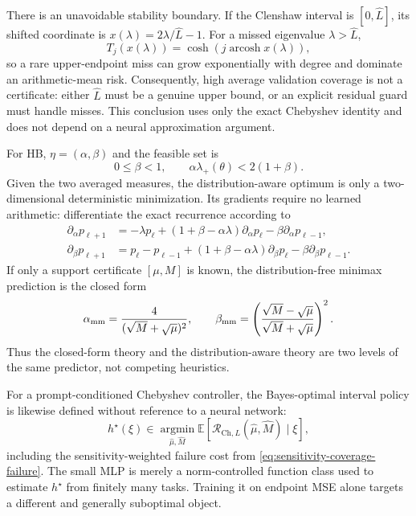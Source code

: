 \documentclass[11pt]{article}
\newcommand{\E}{\mathbb E}
\begin{document}
There is an unavoidable stability boundary.  If the Clenshaw interval is
$[0,\widehat L]$, its shifted coordinate is
$x(\lambda)=2\lambda/\widehat L-1$.  For a missed eigenvalue
$\lambda>\widehat L$,
\[
 T_j(x(\lambda))
 =\cosh\!\left(j\operatorname{arcosh}x(\lambda)\right),
\]
so a rare upper-endpoint miss can grow exponentially with degree and dominate
an arithmetic-mean risk.  Consequently, high average validation coverage is
not a certificate: either $\widehat L$ must be a genuine upper bound, or an
explicit residual guard must handle misses.  This conclusion uses only the
exact Chebyshev identity and does not depend on a neural approximation
argument.

For HB, $\eta=(\alpha,\beta)$ and the feasible set is
\[
 0\leq\beta<1,
 \qquad
 \alpha\lambda_+(\theta)<2(1+\beta).
\]
Given the two averaged measures, the distribution-aware optimum is only a
two-dimensional deterministic minimization.  Its gradients require no
learned arithmetic: differentiate the exact recurrence according to
\begin{align*}
 \partial_\alpha p_{\ell+1}
 &=-\lambda p_\ell+(1+\beta-\alpha\lambda)
 \partial_\alpha p_\ell-\beta\partial_\alpha p_{\ell-1},\\
 \partial_\beta p_{\ell+1}
 &=p_\ell-p_{\ell-1}+(1+\beta-\alpha\lambda)
 \partial_\beta p_\ell-\beta\partial_\beta p_{\ell-1}.
\end{align*}
If only a support certificate $[\mu,M]$ is known, the distribution-free
minimax prediction is the closed form
\[
 \alpha_{\rm mm}=\frac{4}{(\sqrt M+\sqrt\mu)^2},
 \qquad
 \beta_{\rm mm}=
 \left(\frac{\sqrt M-\sqrt\mu}{\sqrt M+\sqrt\mu}\right)^2.
\]
Thus the closed-form theory and the distribution-aware theory are two levels
of the same predictor, not competing heuristics.

For a prompt-conditioned Chebyshev controller, the Bayes-optimal interval
policy is likewise defined without reference to a neural network:
\begin{equation}
 h^\star(\xi)
 \in\operatorname*{argmin}_{\widehat\mu,\widehat M}
 \E\!\left[\mathcal R_{\mathrm{Ch},L}
 (\widehat\mu,\widehat M)\mid\xi\right],
 \label{eq:bayes-chebyshev-policy}
\end{equation}
including the sensitivity-weighted failure cost from
\eqref{eq:sensitivity-coverage-failure}.  The small MLP is merely a
norm-controlled function class used to estimate $h^\star$ from finitely many
tasks.  Training it on endpoint MSE alone targets a different and generally
suboptimal object.
\end{document}
